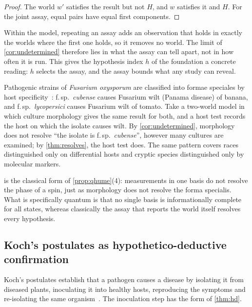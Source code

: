 \begin{proof}
The world $w'$ satisfies the result but not $H$, and $w$ satisfies it and $H$. For the joint
assay, equal pairs have equal first components.
\end{proof}

Within the model, repeating an assay adds an observation that holds in exactly the worlds where the
first one holds, so it removes no world. The limit of \cref{cor:undetermined} therefore lies in what
the assay can tell apart, not in how often it is run. This gives the hypothesis index $h$ of the
foundation a concrete reading: $h$ selects the assay, and the assay bounds what any study can
reveal.

\begin{example}\label{ex:fusarium}
Pathogenic strains of \emph{Fusarium oxysporum} are classified into formae speciales by host
specificity~\cite{jackson2024}: f.\,sp.\ \emph{cubense} causes Fusarium wilt (Panama disease) of
banana, and f.\,sp.\ \emph{lycopersici} causes Fusarium wilt of tomato. Take a two-world model in
which culture morphology gives the same result for both, and a host test records the host on
which the isolate causes wilt. By \cref{cor:undetermined}, morphology does not resolve ``the
isolate is f.\,sp.\ \emph{cubense}'', however many cultures are examined; by
\cref{thm:resolves}, the host test does. The same pattern covers races distinguished only on
differential hosts and cryptic species distinguished only by molecular markers.
\end{example}

 is the classical form of \cref{prop:qhume}(4): measurements in one basis
do not resolve the phase of a spin, just as morphology does not resolve the forma specialis. What
is specifically quantum is that no single basis is informationally complete for all states,
whereas classically the assay that reports the world itself resolves every hypothesis.

\subsection{Koch's postulates as hypothetico-deductive confirmation}

Koch's postulates establish that a pathogen causes a disease by isolating it from diseased
plants, inoculating it into healthy hosts, reproducing the symptoms and re-isolating the same
organism~\cite{agrios2005}. The inoculation step has the form of \cref{thm:hd}.

